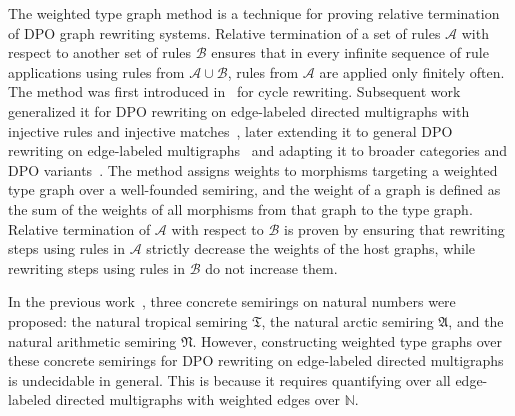 
 
The weighted type graph method is a technique for proving relative termination~\cite{geser1990relative} of DPO graph rewriting systems. 
Relative termination of a set of rules $\mathcal{A}$ with respect to another set of rules $\mathcal{B}$ ensures that in every infinite sequence of rule applications using rules from  $\mathcal{A} \cup \mathcal{B}$, rules from $\mathcal{A}$ are applied only finitely often. The method was first introduced in~\cite{zantema2014termination} for cycle rewriting. Subsequent work generalized it for DPO rewriting on edge-labeled directed multigraphs with injective rules and injective matches~\cite{bruggink2014termination}, later extending it to general DPO rewriting on edge-labeled multigraphs~\cite{bruggink2015proving} and adapting it to broader categories and DPO variants~\cite{endrullis2024generalized_arxiv_v2}.
The method assigns weights to morphisms targeting a weighted type graph over a well-founded semiring, and the weight of a graph is defined
 as the sum of the weights of all morphisms from that graph to the type graph. Relative termination of $\mathcal{A}$ with respect to $\mathcal{B}$ is proven by ensuring that rewriting steps using rules in \( \mathcal{A} \) strictly decrease the weights of the host graphs, while rewriting steps using rules in \( \mathcal{B} \) do not increase them.
   
    In the previous work~\cite{zantema2014termination,bruggink2014termination,bruggink2015proving}, three concrete semirings on natural numbers were proposed: the natural tropical semiring $\mathfrak{T}$, the natural arctic semiring $\mathfrak{A}$, and the natural arithmetic semiring $\mathfrak{N}$.
    However, constructing weighted type graphs over these concrete semirings for DPO rewriting on edge-labeled directed multigraphs is undecidable in general. This is because it requires quantifying over all edge-labeled directed multigraphs with weighted edges over $\mathbb{N}$. 

